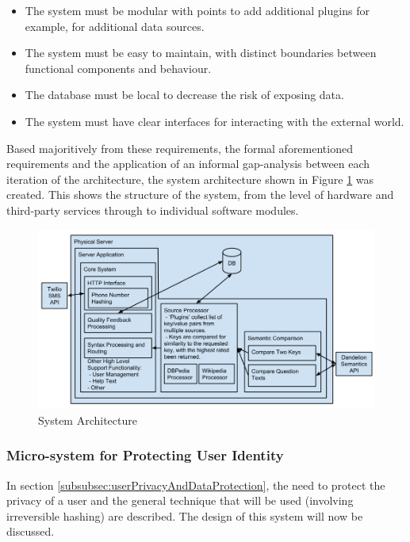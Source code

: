 \documentclass{article}
\begin{document}
\begin{itemize}
    \item The system must be modular with points to add additional plugins for example, for additional data sources.
    \item The system must be easy to maintain, with distinct boundaries between functional components and behaviour.
    \item The database must be local to decrease the risk of exposing data.
    \item The system must have clear interfaces for interacting with the external world.
\end{itemize}

Based majoritively from these requirements, the formal aforementioned requirements and the application of an informal gap-analysis between each iteration of the architecture, the system architecture shown in Figure \ref{fig:systemArchitecture} was created.  This shows the structure of the system, from the level of hardware and third-party services through to individual software modules.

\begin{figure}[htb] 
\includegraphics[width=\linewidth]{systemArchitecture}
\caption{System Architecture}
\label{fig:systemArchitecture}
\end{figure}

\subsubsection{Micro-system for Protecting User Identity}

In section \ref{subsubsec:userPrivacyAndDataProtection}, the need to protect the privacy of a user and the general technique that will be used (involving irreversible hashing) are described.  The design of this system will now be discussed.
\end{document}
